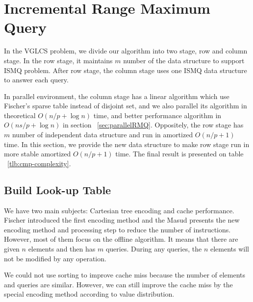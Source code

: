\section{Incremental Range Maximum Query}

In the VGLCS problem, we divide our algorithm into two stage, row and
column stage.  In the row stage, it maintains $m$ number of the data
structure to support ISMQ problem.  After row stage, the column stage
uses one ISMQ data structure to answer each query.

In parallel environment, the column stage has a linear algorithm which
use Fischer's sparse table instead of disjoint set, and we also
parallel its algorithm in theoretical $O(n / p + \log n)$ time, and
better performance algorithm in $O(n s / p + \log n)$ in section
~\ref{sec:parallelRMQ}.  Oppositely, the row stage has $m$ number of
independent data structure and run in amortized $O(n / p + 1)$ time.
In this section, we provide the new data structure to make row stage
run in more stable amortized $O(n / p + 1)$ time.   The final result
is presented on table ~\ref{tlb:cmp-complexity}.

\iffalse
VGLCS 問題主要分成縱向和橫向兩階段，縱向處理每一列的區間極值查找，橫向處理每一行的區間極值查找，
兩者合併構成區域極值查找。在縱向方面為數個獨立的數據結構，這部分易於平行；
相反地，在橫向方面，需要共同協作一個數據結構。
綜觀這兩者的差異，縱向需要動態的後綴插入和區間查詢，而橫向可以離線完成區間查找。
在上一節中，我們提出在橫向處理的實作，若限制上述的實作方案在單一處理器上，
時間複雜度的瓶頸在於縱向的動態更新與查找。

在這個章節中，我們提出支持動態插入和區間查找的數據結構，最後的成果如表 \ref{tlb:cmp-complexity}。
\fi




\subsection{Build Look-up Table}

We have two main subjects: Cartesian tree encoding and cache
performance.  Fischer introduced the first encoding method and the
Masud presents the new encoding method and processing step to reduce
the number of instructions.  However, most of them focus on the
offline algorithm.  It means that there are given $n$ elements and
then has $m$ queries.  During any queries, the $n$ elements will not
be modified by any operation.

We could not use sorting to improve cache miss because the number of
elements and queries are similar.  However, we can still improve the
cache miss by the special encoding method according to value
distribution.

